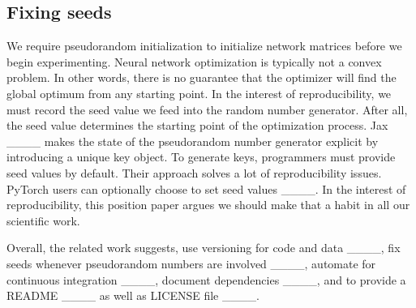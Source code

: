 \subsection{Fixing seeds}
We require pseudorandom initialization to initialize network matrices before we begin experimenting. Neural network optimization is typically not a convex problem. In other words, there is no guarantee that the optimizer will find the global optimum from any starting point.
In the interest of reproducibility, we must record the seed value we feed into the random number generator. After all, the seed value determines the starting point of the optimization process. Jax ____ makes the state of the pseudorandom number generator explicit by introducing a unique key object. To generate keys, programmers must provide seed values by default. Their approach solves a lot of reproducibility issues.
PyTorch users can optionally choose to set seed values ____. In the interest of reproducibility, this position paper argues we should make that a habit in all our scientific work.


Overall, the related work suggests,
use versioning for code and data ____,
fix seeds whenever pseudorandom numbers are involved ____,
automate for continuous integration ____, 
document dependencies ____,
and to provide a README ____ as well as LICENSE file ____.